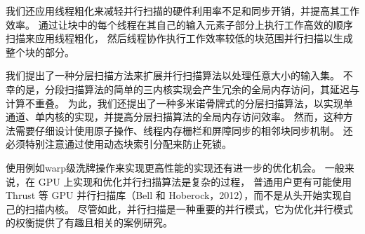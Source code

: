 我们还应用线程粗化来减轻并行扫描的硬件利用率不足和同步开销，并提高其工作效率。 
通过让块中的每个线程在其自己的输入元素子部分上执行工作高效的顺序扫描来应用线程粗化，
然后线程协作执行工作效率较低的块范围并行扫描以生成整个块的部分。

我们提出了一种分层扫描方法来扩展并行扫描算法以处理任意大小的输入集。 
不幸的是，分段扫描算法的简单的三内核实现会产生冗余的全局内存访问，其延迟与计算不重叠。 
为此，我们还提出了一种多米诺骨牌式的分层扫描算法，以实现单通道、单内核的实现，并提高分层扫描算法的全局内存访问效率。 
然而，这种方法需要仔细设计使用原子操作、线程内存栅栏和屏障同步的相邻块同步机制。 
还必须特别注意通过使用动态块索引分配来防止死锁。

使用例如warp级洗牌操作来实现更高性能的实现还有进一步的优化机会。 
一般来说，在 GPU 上实现和优化并行扫描算法是复杂的过程，
普通用户更有可能使用 Thrust 等 GPU 并行扫描库（Bell 和 Hoberock，2012），而不是从头开始实现自己的扫描内核。 
尽管如此，并行扫描是一种重要的并行模式，它为优化并行模式的权衡提供了有趣且相关的案例研究。